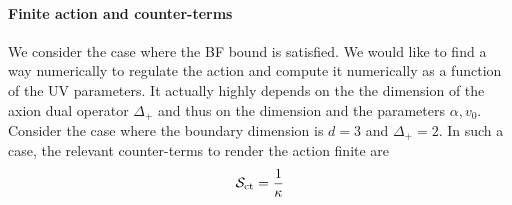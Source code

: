 \documentclass[a4paper]{article}
\begin{document}
\paragraph{Finite action and counter-terms}
We consider the case where the BF bound is satisfied. We would like to find a way numerically to regulate the action and compute it numerically as a function of the UV parameters. It actually highly depends on the the dimension of the axion dual operator $\Delta_+$ and thus on the dimension and the parameters $\alpha,v_0$. Consider the case where the boundary dimension is $d=3$ and $\Delta_+=2$. In such a case, the relevant counter-terms to render the action finite are
\begin{equation}
  \mathcal{S}_{\rm ct} = \frac{1}{\kappa}
\end{equation}
\end{document}
